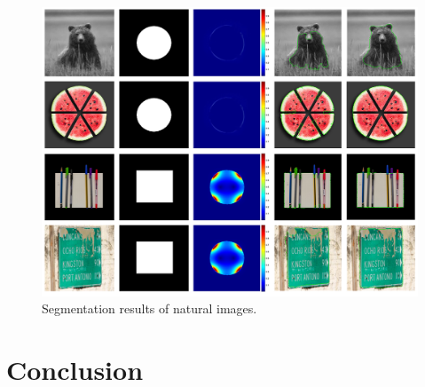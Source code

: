 \documentclass[review,onefignum,onetabnum]{siamonline190516}
\begin{document}
\begin{figure}
    \begin{center}
        \includegraphics[width=15.5cm]{src/exp3.png}
    \end{center}
    \caption{Segmentation results of natural images.}
    \label{exp3}
\end{figure}



\section{Conclusion}\label{conclusion}


\end{document}

